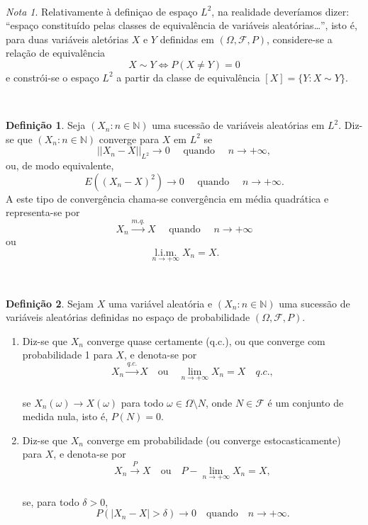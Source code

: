 \documentclass[
  11pt,
  a4paper,
]{book}
\theoremstyle{definition}
\newtheorem{definition}{Definição}[chapter]
\theoremstyle{definition}
\theoremstyle{definition}
\theoremstyle{definition}
\theoremstyle{remark}
\newtheorem*{remark}{Nota }
\begin{document}
\(\,\)

\begin{remark}
Relativamente à definiçao de espaço \(L^2\), na realidade deveríamos dizer: ``espaço constituído pelas classes de equivalência de variáveis aleatórias\ldots{}'', isto é, para duas variáveis aletórias \(X\) e \(Y\) definidas em \((\Omega,\mathcal{F},P)\), considere-se a relação de equivalência
\[X \sim Y \iff P(X \neq Y)=0\]
e constrói-se o espaço \(L^2\) a partir da classe de equivalência \([X]=\{Y: X \sim Y\}\).
\end{remark}

\(\,\)

\begin{definition}
Seja \((X_n: n \in \mathbb{N})\) uma sucessão de variáveis aleatórias em \(L^2\). Diz-se que \((X_n: n \in \mathbb{N})\) converge para \(X\) em \(L^2\) se
\[||X_n-X||_{L^2}\rightarrow 0 \quad \text{ quando } \quad n \to +\infty,\]
ou, de modo equivalente,
\[E((X_n-X)^2) \to 0 \quad \text{ quando } \quad n \to +\infty.\]
A este tipo de convergência chama-se convergência em média quadrática e representa-se por
\[X_n \xrightarrow{m.q.}X \quad \text{ quando } \quad n \to +\infty\]
ou
\[\mathop{l.i.m.}\limits_{n \to +\infty}X_n=X.\]
\end{definition}

\(\,\)

\begin{definition}

Sejam \(X\) uma variável aleatória e \((X_n : n \in \mathbb{N})\) uma sucessão de variáveis aleatórias definidas no espaço de probabilidade \((\Omega, \mathcal{F}, P)\).

\begin{enumerate}
\def\labelenumi{\roman{enumi})}
\item
  Diz-se que \(X_n\) converge quase certamente (q.c.), ou que converge com probabilidade 1 para \(X\), e denota-se por\\
  \[
  X_n \xrightarrow{q.c.} X \quad \text{ou} \quad \lim_{n \to +\infty} X_n = X \quad q.c.,
  \]\\
  se \(X_n(\omega) \to X(\omega)\) para todo \(\omega \in \Omega \setminus N\), onde \(N \in \mathcal{F}\) é um conjunto de medida nula, isto é, \(P(N) = 0\).
\item
  Diz-se que \(X_n\) converge em probabilidade (ou converge estocasticamente) para \(X\), e denota-se por\\
  \[
  X_n \xrightarrow{P} X \quad \text{ou} \quad P-\lim_{n \to +\infty} X_n = X,
  \]\\
  se, para todo \(\delta > 0\),\\
  \[
  P(|X_n - X| > \delta) \to 0 \quad \text{quando} \quad n \to +\infty.
  \]\\
\end{enumerate}

\end{definition}
\end{document}
